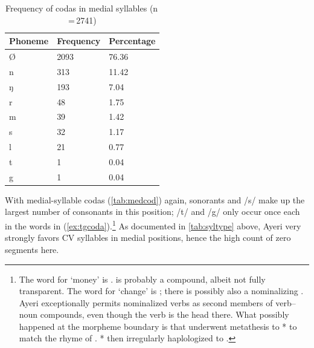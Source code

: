 \begin{table}\centering
\caption[Frequency of codas in medial syllables]{Frequency of codas in medial 
syllables (n\,=\,2741)}
\begin{tabu} to 0.67\linewidth{X X[c] X[c]}
\tableheaderfont\toprule
Phoneme
	& Frequency
	& Percentage
	\\
	
\toprule

Ø
	& 2093
	& 76.36\pct
	\\

\midrule

n
	& 313
	& 11.42\pct
	\\

ŋ
	& 193
	& 7.04\pct
	\\

r
	& 48
	& 1.75\pct
	\\

m
	& 39
	& 1.42\pct
	\\

s
	& 32
	& 1.17\pct
	\\

l
	& 21
	& 0.77\pct
	\\

t
	& 1
	& 0.04\pct
	\\

g
	& 1
	& 0.04\pct
	\\

\bottomrule
\end{tabu}
\label{tab:medcod}
\end{table}

With medial-syllable codas (\autoref{tab:medcod}) again, sonorants and /s/ make
up the largest number of consonants in this position; /t/ and /g/ only occur
once each in the words in (\ref{ex:tgcoda}).\footnote{The word for `money' is
.  is probably a compound,
albeit not fully transparent. The word for `change' is ;
there is possibly also a nominalizing . Ayeri exceptionally
permits nominalized verbs as second members of verb--noun compounds, even
though the verb is the head there. What possibly happened at the morpheme
boundary is that  underwent metathesis to
* to match the rhyme of .
* then irregularly haplologized to
.} As documented in \autoref{tab:syltype} above,
Ayeri very strongly favors CV syllables in medial positions, hence the high
count of zero segments here.

